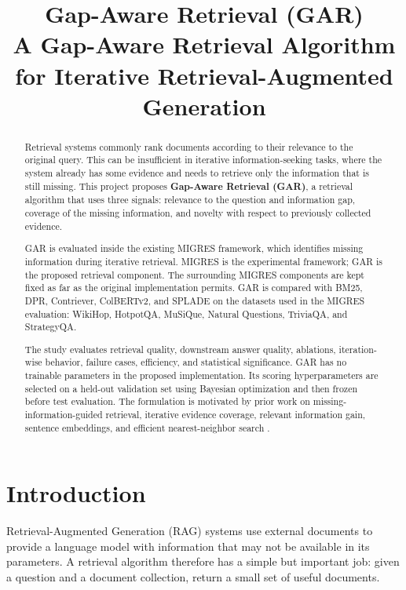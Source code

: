 \documentclass[11pt,a4paper]{article}
\title{\textbf{Gap-Aware Retrieval (GAR)}\\
\large A Gap-Aware Retrieval Algorithm for Iterative Retrieval-Augmented Generation}
\author{}
\date{}
\begin{document}
\maketitle

\begin{abstract}
Retrieval systems commonly rank documents according to their relevance to the original query. This can be insufficient in iterative information-seeking tasks, where the system already has some evidence and needs to retrieve only the information that is still missing. This project proposes \textbf{Gap-Aware Retrieval (GAR)}, a retrieval algorithm that uses three signals: relevance to the question and information gap, coverage of the missing information, and novelty with respect to previously collected evidence.

GAR is evaluated inside the existing MIGRES framework, which identifies missing information during iterative retrieval. MIGRES is the experimental framework; GAR is the proposed retrieval component. The surrounding MIGRES components are kept fixed as far as the original implementation permits. GAR is compared with BM25, DPR, Contriever, ColBERTv2, and SPLADE on the datasets used in the MIGRES evaluation: WikiHop, HotpotQA, MuSiQue, Natural Questions, TriviaQA, and StrategyQA.

The study evaluates retrieval quality, downstream answer quality, ablations, iteration-wise behavior, failure cases, efficiency, and statistical significance. GAR has no trainable parameters in the proposed implementation. Its scoring hyperparameters are selected on a held-out validation set using Bayesian optimization and then frozen before test evaluation. The formulation is motivated by prior work on missing-information-guided retrieval, iterative evidence coverage, relevant information gain, sentence embeddings, and efficient nearest-neighbor search \citep{wang-etal-2025-llms,yadav-etal-2020-unsupervised,pickett-etal-2024-rig,reimers-gurevych-2019-sentence,johnson-etal-2017-faiss}.
\end{abstract}

\section{Introduction}

Retrieval-Augmented Generation (RAG) systems use external documents to provide a language model with information that may not be available in its parameters. A retrieval algorithm therefore has a simple but important job: given a question and a document collection, return a small set of useful documents.
\end{document}
